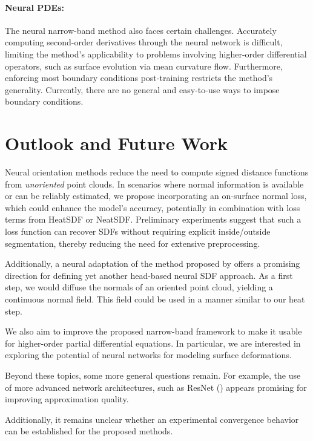 \documentclass[12pt,openany]{book}
\theoremstyle{plainnormal}
\theoremstyle{remark}
\begin{document}
\paragraph{Neural PDEs:} The neural narrow-band method also faces certain challenges. Accurately computing second-order derivatives through the neural network is difficult, limiting the method's applicability to problems involving higher-order differential operators, such as surface evolution via mean curvature flow. Furthermore, enforcing most boundary conditions post-training restricts the method's generality. Currently, there are no general and easy-to-use ways to impose boundary conditions. 
\section{Outlook and Future Work}
Neural orientation methods reduce the need to compute signed distance functions from \emph{unoriented} point clouds. In scenarios where normal information is available or can be reliably estimated, we propose incorporating an on-surface normal loss, which could enhance the model's accuracy, potentially in combination with loss terms from HeatSDF or NeatSDF. Preliminary experiments suggest that such a loss function can recover SDFs without requiring explicit inside/outside segmentation, thereby reducing the need for extensive preprocessing.\par
Additionally, a neural adaptation of the method proposed by \cite{FengCrane} offers a promising direction for defining yet another head-based neural SDF approach. As a first step, we would diffuse the normals of an oriented point cloud, yielding a continuous normal field. This field could be used in a manner similar to our heat step.\par
We also aim to improve the proposed narrow-band framework to make it usable for higher-order partial differential equations. In particular, we are interested in exploring the potential of neural networks for modeling surface deformations.\par
Beyond these topics, some more general questions remain. For example, the use of more advanced network architectures, such as ResNet (\cite{he2015deepresiduallearningimage}) appears promising for improving approximation quality. \par
Additionally, it remains unclear whether an experimental convergence behavior can be established for the proposed methods.
\endgroup
{
\setlength{\bibsep}{7pt}


}
\end{document}
